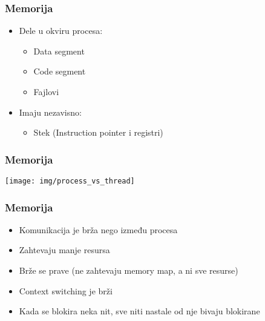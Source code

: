 \documentclass{beamer}
\begin{document}
\begin{frame}
    \frametitle{Memorija}
    \begin{itemize}
        \item Dele u okviru procesa: \begin{itemize}
            \item Data segment \newline
            \item Code segment \newline
            \item Fajlovi \newline
        \end{itemize}
        \item Imaju nezavisno: \begin{itemize}
            \item Stek (Instruction pointer i registri)\newline
        \end{itemize}
    \end{itemize}   
\end{frame}

\begin{frame}
    \frametitle{Memorija}
    \begin{center}
        \texttt{[image: img/process\_vs\_thread]}
    \end{center}
\end{frame}

\begin{frame}
    \frametitle{Memorija}
    \begin{itemize}
        \item Komunikacija je brža nego između procesa \newline
        \item Zahtevaju manje resursa \newline
        \item Brže se prave (ne zahtevaju memory map, a ni sve resurse) \newline
        \item Context switching je brži \newline
        \item Kada se blokira neka nit, sve niti nastale od nje bivaju blokirane
    \end{itemize}
\end{frame}
\end{document}
